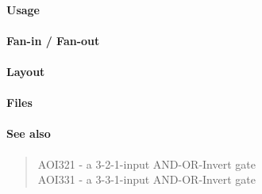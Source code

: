 \paragraph{Usage}

\paragraph{Fan-in / Fan-out}

\paragraph{Layout}

\paragraph{Files}

\paragraph{See also}
\begin{quote}
    AOI321 - a 3-2-1-input AND-OR-Invert gate \\
    AOI331 - a 3-3-1-input AND-OR-Invert gate
\end{quote}
